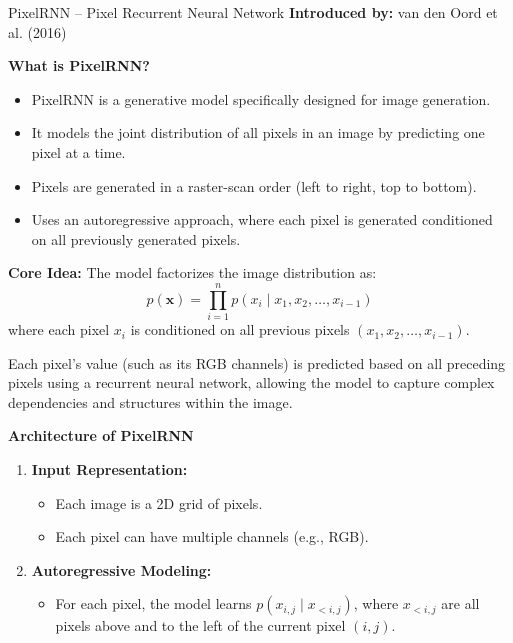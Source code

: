 \begin{frame}[allowframebreaks]{PixelRNN – Pixel Recurrent Neural Network}
    \textbf{Introduced by:} van den Oord et al. (2016)

    \vspace{1em}
    \textbf{What is PixelRNN?}

    \begin{itemize}
        \item PixelRNN is a generative model specifically designed for image generation.
        \item It models the joint distribution of all pixels in an image by predicting one pixel at a time.
        \item Pixels are generated in a raster-scan order (left to right, top to bottom).
        \item Uses an autoregressive approach, where each pixel is generated conditioned on all previously generated pixels.
    \end{itemize}  

    \framebreak
    
    \textbf{Core Idea:}
    The model factorizes the image distribution as:
    \[
    p(\mathbf{x}) = \prod_{i=1}^{n} p(x_i \mid x_1, x_2, \ldots, x_{i-1})
    \]
    where each pixel $x_i$ is conditioned on all previous pixels $(x_1, x_2, \ldots, x_{i-1})$.

    Each pixel's value (such as its RGB channels) is predicted based on all preceding pixels using a recurrent neural network, allowing the model to capture complex dependencies and structures within the image.
    
    \framebreak
    \textbf{Architecture of PixelRNN}

    \begin{enumerate}
        \setlength{\itemsep}{-0.25em}
        \item \textbf{Input Representation:}
        \begin{itemize}
            \setlength{\itemsep}{-0.25em}
            \item Each image is a 2D grid of pixels.
            \item Each pixel can have multiple channels (e.g., RGB).
        \end{itemize}

        \item \textbf{Autoregressive Modeling:}
        \begin{itemize}
            \item For each pixel, the model learns $p(x_{i,j} \mid x_{<i,j})$, where $x_{<i,j}$ are all pixels above and to the left of the current pixel $(i, j)$.
        \end{itemize}


\end{enumerate}
\end{frame}
